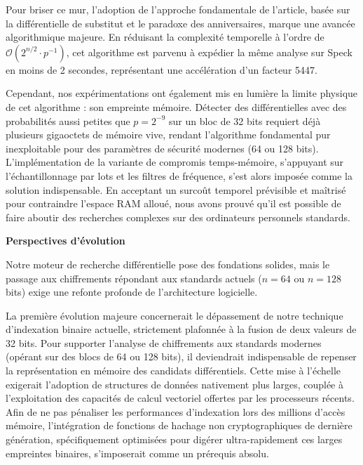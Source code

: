 \documentclass[a4paper,11pt]{article}
\begin{document}
Pour briser ce mur, l'adoption de l'approche fondamentale de l'article, basée sur la différentielle de substitut et le paradoxe des anniversaires, marque une avancée algorithmique majeure. En réduisant la complexité temporelle à l'ordre de $\mathcal{O}(2^{n/2} \cdot p^{-1})$, cet algorithme est parvenu à expédier la même analyse sur Speck en moins de 2 secondes, représentant une accélération d'un facteur 5447.

Cependant, nos expérimentations ont également mis en lumière la limite physique de cet algorithme : son empreinte mémoire. Détecter des différentielles avec des probabilités aussi petites que $p=2^{-9}$ sur un bloc de 32 bits requiert déjà plusieurs gigaoctets de mémoire vive, rendant l'algorithme fondamental pur inexploitable pour des paramètres de sécurité modernes (64 ou 128 bits). L'implémentation de la variante de compromis temps-mémoire, s'appuyant sur l'échantillonnage par lots et les filtres de fréquence, s'est alors imposée comme la solution indispensable. En acceptant un surcoût temporel prévisible et maîtrisé pour contraindre l'espace RAM alloué, nous avons prouvé qu'il est possible de faire aboutir des recherches complexes sur des ordinateurs personnels standards.

\vspace{0.5cm}

\noindent \textbf{Perspectives d'évolution}

Notre moteur de recherche différentielle pose des fondations solides, mais le passage aux chiffrements répondant aux standards actuels ($n = 64$ ou $n = 128$ bits) exige une refonte profonde de l'architecture logicielle.

La première évolution majeure concernerait le dépassement de notre technique d'indexation binaire actuelle, strictement plafonnée à la fusion de deux valeurs de 32 bits. Pour supporter l'analyse de chiffrements aux standards modernes (opérant sur des blocs de 64 ou 128 bits), il deviendrait indispensable de repenser la représentation en mémoire des candidats différentiels. Cette mise à l'échelle exigerait l'adoption de structures de données nativement plus larges, couplée à l'exploitation des capacités de calcul vectoriel offertes par les processeurs récents. Afin de ne pas pénaliser les performances d'indexation lors des millions d'accès mémoire, l'intégration de fonctions de hachage non cryptographiques de dernière génération, spécifiquement optimisées pour digérer ultra-rapidement ces larges empreintes binaires, s'imposerait comme un prérequis absolu.
\end{document}
